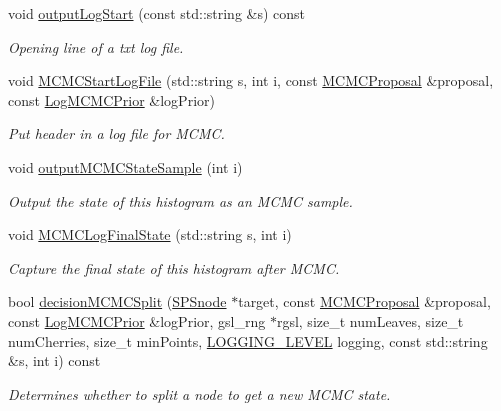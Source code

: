 \begin{DoxyCompactItemize}
void \hyperlink{classsubpavings_1_1AdaptiveHistogram_ad847a4add7e72eac564daa44835dba5b}{output\-Log\-Start} (const std\-::string \&s) const 
\begin{DoxyCompactList}\small\item\em \-Opening line of a txt log file. \end{DoxyCompactList}\item 
void \hyperlink{classsubpavings_1_1AdaptiveHistogram_adf589f52a0cd3e2371c288aa6bca7d37}{\-M\-C\-M\-C\-Start\-Log\-File} (std\-::string s, int i, const \hyperlink{classsubpavings_1_1MCMCProposal}{\-M\-C\-M\-C\-Proposal} \&proposal, const \hyperlink{classsubpavings_1_1LogMCMCPrior}{\-Log\-M\-C\-M\-C\-Prior} \&log\-Prior)
\begin{DoxyCompactList}\small\item\em \-Put header in a log file for \-M\-C\-M\-C. \end{DoxyCompactList}\item 
void \hyperlink{classsubpavings_1_1AdaptiveHistogram_a4e7d34aea502906cb2230c0732d752b3}{output\-M\-C\-M\-C\-State\-Sample} (int i)
\begin{DoxyCompactList}\small\item\em \-Output the state of this histogram as an \-M\-C\-M\-C sample. \end{DoxyCompactList}\item 
void \hyperlink{classsubpavings_1_1AdaptiveHistogram_a10fc830a1dd32fe83aa3846a6fb2af35}{\-M\-C\-M\-C\-Log\-Final\-State} (std\-::string s, int i)
\begin{DoxyCompactList}\small\item\em \-Capture the final state of this histogram after \-M\-C\-M\-C. \end{DoxyCompactList}\item 
bool \hyperlink{classsubpavings_1_1AdaptiveHistogram_a89aa9c37916fcac47cf273f512bca019}{decision\-M\-C\-M\-C\-Split} (\hyperlink{classsubpavings_1_1SPSnode}{\-S\-P\-Snode} $\ast$target, const \hyperlink{classsubpavings_1_1MCMCProposal}{\-M\-C\-M\-C\-Proposal} \&proposal, const \hyperlink{classsubpavings_1_1LogMCMCPrior}{\-Log\-M\-C\-M\-C\-Prior} \&log\-Prior, gsl\-\_\-rng $\ast$rgsl, size\-\_\-t num\-Leaves, size\-\_\-t num\-Cherries, size\-\_\-t min\-Points, \hyperlink{namespacesubpavings_aef8e51096b59ecaf1a1e9b2ee24b6089}{\-L\-O\-G\-G\-I\-N\-G\-\_\-\-L\-E\-V\-E\-L} logging, const std\-::string \&s, int i) const 
\begin{DoxyCompactList}\small\item\em \-Determines whether to split a node to get a new \-M\-C\-M\-C state. \end{DoxyCompactList}\item 

\end{DoxyCompactItemize}
